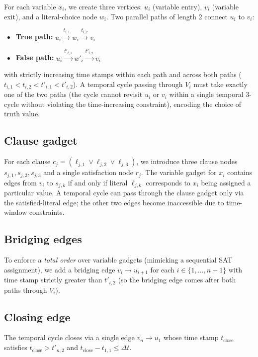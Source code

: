 \documentclass[journal,onecolumn]{IEEEtran}
\begin{document}
For each variable $x_i$, we create three vertices: $u_i$ (variable entry),
$v_i$ (variable exit), and a literal-choice node $w_i$. Two parallel paths
of length 2 connect $u_i$ to $v_i$:
\begin{itemize}
\item \textbf{True path:} $u_i \xrightarrow{t_{i,1}} w_i \xrightarrow{t_{i,2}} v_i$
\item \textbf{False path:} $u_i \xrightarrow{t'_{i,1}} w'_i \xrightarrow{t'_{i,2}} v_i$
\end{itemize}
with strictly increasing time stamps within each path and across both paths
($t_{i,1} < t_{i,2} < t'_{i,1} < t'_{i,2}$). A temporal cycle passing through
$V_i$ must take exactly one of the two paths (the cycle cannot revisit
$u_i$ or $v_i$ within a single temporal 3-cycle without violating the
time-increasing constraint), encoding the choice of truth value.

\subsection{Clause gadget}

For each clause $c_j = (\ell_{j,1} \lor \ell_{j,2} \lor \ell_{j,3})$, we
introduce three clause nodes $s_{j,1}, s_{j,2}, s_{j,3}$ and a single
satisfaction node $r_j$. The variable gadget for $x_i$ contains edges
from $v_i$ to $s_{j,k}$ if and only if literal $\ell_{j,k}$ corresponds to
$x_i$ being assigned a particular value. A temporal cycle can pass through
the clause gadget only via the satisfied-literal edge; the other two
edges become inaccessible due to time-window constraints.

\subsection{Bridging edges}

To enforce a \emph{total order} over variable gadgets (mimicking a
sequential SAT assignment), we add a bridging edge $v_i \to u_{i+1}$ for
each $i \in \{1, \ldots, n-1\}$ with time stamp strictly greater than
$t'_{i,2}$ (so the bridging edge comes after both paths through $V_i$).

\subsection{Closing edge}

The temporal cycle closes via a single edge $v_n \to u_1$ whose time
stamp $t_{\mathrm{close}}$ satisfies $t_{\mathrm{close}} > t'_{n,2}$ and
$t_{\mathrm{close}} - t_{1,1} \leq \Delta t$.
\end{document}
